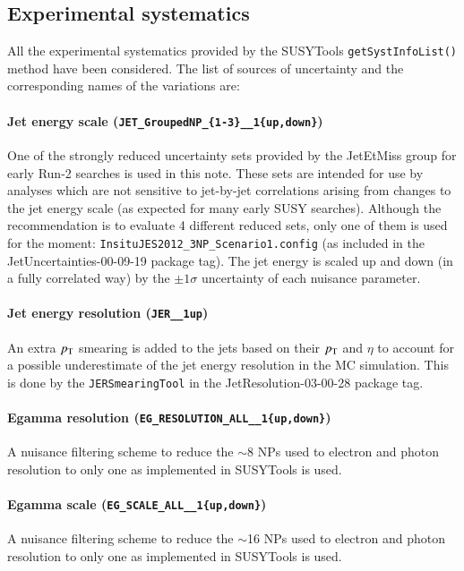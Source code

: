 
\subsection{Experimental systematics}
\label{sec:syst_exp}

All the  experimental systematics provided by the SUSYTools {\tt getSystInfoList()} method have been considered. 
The list of sources of uncertainty and the corresponding names of the variations are:

\paragraph{Jet energy scale ({\tt{JET\_GroupedNP\_\{1-3\}\_\_1\{up,down\}}})}  
One of the strongly reduced uncertainty sets provided by the JetEtMiss group for early Run-2 searches is used in this note. These sets are intended for use by analyses which are not sensitive to jet-by-jet correlations arising from changes to the jet energy scale (as expected for many early SUSY searches). Although the recommendation is to evaluate 4 different reduced sets, only one of them is used for the moment: {\tt InsituJES2012\_3NP\_Scenario1.config} (as included in the JetUncertainties-00-09-19 package tag).
The jet energy is scaled up and down (in a fully correlated way) by the $\pm 1\sigma$ uncertainty of each nuisance parameter.

\paragraph{Jet energy resolution ({\tt{JER\_\_1up}})}  An extra $p_{\mathrm{T}}$ smearing is added to the jets based on their $p_{\mathrm{T}}$ and $\eta$ to account for a possible underestimate of the jet energy resolution in the MC simulation. This is done by the {\tt JERSmearingTool} in the JetResolution-03-00-28 package tag.

\paragraph{Egamma resolution ({\tt{EG\_RESOLUTION\_ALL\_\_1\{up,down\}}})} A nuisance filtering scheme to reduce the $\sim$8 NPs used to electron and photon resolution to only one as implemented in SUSYTools is used.

\paragraph{Egamma scale ({\tt{EG\_SCALE\_ALL\_\_1\{up,down\}}})}
A nuisance filtering scheme to reduce the $\sim$16 NPs used to electron and photon resolution to only one as implemented in SUSYTools is used.


